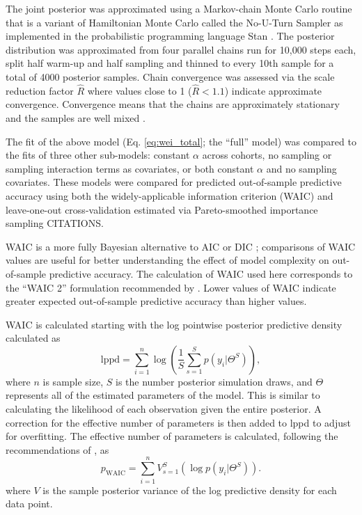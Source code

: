 \documentclass{article}
\begin{document}
The joint posterior was approximated using a Markov-chain Monte Carlo routine that is a variant of Hamiltonian Monte Carlo called the No-U-Turn Sampler \citep{Hoffman2014} as implemented in the probabilistic programming language Stan \citep{2014stan}. The posterior distribution was approximated from four parallel chains run for 10,000 steps each, split half warm-up and half sampling and thinned to every 10th sample for a total of 4000 posterior samples. Chain convergence was assessed via the scale reduction factor \(\hat{R}\) where values close to 1 (\(\hat{R} < 1.1\)) indicate approximate convergence. Convergence means that the chains are approximately stationary and the samples are well mixed \citep{Gelman2013d}.

The fit of the above model (Eq. \ref{eq:wei_total}; the ``full'' model) was compared to the fits of three other sub-models: constant \(\alpha\) across cohorts, no sampling or sampling interaction terms as covariates, or both constant \(\alpha\) and no sampling covariates. These models were compared for predicted out-of-sample predictive accuracy using both the widely-applicable information criterion (WAIC) and leave-one-out cross-validation estimated via Pareto-smoothed importance sampling CITATIONS.

WAIC is a more fully Bayesian alternative to AIC or DIC \citep{Watanabe2010a,Gelman2013d}; comparisons of WAIC values are useful for better understanding the effect of model complexity on out-of-sample predictive accuracy. The calculation of WAIC used here corresponds to the ``WAIC 2'' formulation recommended by \citet{Gelman2013d}. Lower values of WAIC indicate greater expected out-of-sample predictive accuracy than higher values.

WAIC is calculated starting with the log pointwise posterior predictive density calculated as
\begin{equation}
  \mathrm{lppd} = \sum_{i = 1}^{n} \log \left(\frac{1}{S} \sum_{s = 1}^{S} p(y_{i}|\Theta^{S})\right),
  \label{eq:lppd}
\end{equation}
where \(n\) is sample size, \(S\) is the number posterior simulation draws, and \(\Theta\) represents all of the estimated parameters of the model. This is similar to calculating the likelihood of each observation given the entire posterior. A correction for the effective number of parameters is then added to lppd to adjust for overfitting. The effective number of parameters is calculated, following the recommendations of \citet{Gelman2013d}, as
\begin{equation}
  p_{\mathrm{WAIC}} = \sum_{i = 1}^{n} V_{s = 1}^{S} (\log p(y_{i}|\Theta^{S})).
  \label{eq:pwaic}
\end{equation}
where \(V\) is the sample posterior variance of the log predictive density for each data point.
\end{document}
